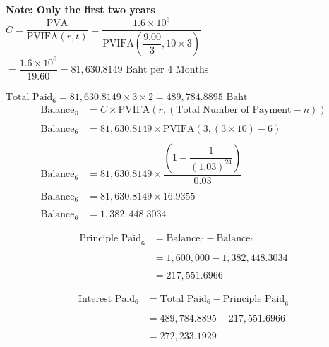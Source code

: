 \documentclass{article}
\begin{document}
\begin{outline}[enumerate]
	\2 \textbf{Note: Only the first two years }\\
		$ C = \dfrac{\mbox{PVA}}{\mbox{PVIFA}(r, t)} = \dfrac{1.6 \times 10^6}{\mbox{PVIFA}\left(\dfrac{9.00}{3}, 10 \times 3 \right)} $
		$ 	= \dfrac{1.6 \times 10^6}{19.60} =  81,630.8149 \mbox{ Baht per 4 Months}$\\\\
		$\mbox{Total Paid}_6 = 81,630.8149 \times 3 \times 2 = 489,784.8895 \mbox{ Baht} $
	\begin{align*}
		\mbox{Balance}_n &= C \times \mbox{PVIFA}(r, (\mbox{Total Number of Payment} - n)) \\\\
		\mbox{Balance}_6 &= 81,630.8149 \times \mbox{PVIFA}(3, (3 \times 10) - 6) \\\\
		\mbox{Balance}_6 &= 81,630.8149 \times \dfrac{\left(1 - \dfrac{1}{(1.03)^{24}}\right)}{0.03} \\\\
		\mbox{Balance}_6 &= 81,630.8149 \times 16.9355 \\\\
		\mbox{Balance}_6 &= 1,382,448.3034
	\end{align*}
	
	\begin{align*}
		\mbox{Principle Paid}_6 &= \mbox{Balance}_0 - \mbox{Balance}_6 \\\\
		&= 1,600,000 - 1,382,448.3034 \\\\
		&= 217,551.6966
	\end{align*}

	\begin{align*}
		\mbox{Interest Paid}_6 &= \mbox{Total Paid}_6 - \mbox{Principle Paid}_6 \\\\
		&= 489,784.8895 - 217,551.6966 \\\\
		&= 272,233.1929
	\end{align*}


		
		
		
\end{outline}
\end{document}
